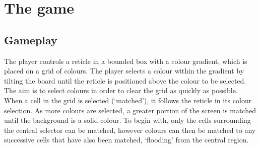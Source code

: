 \section{The game}
\subsection{Gameplay}
The player controls a reticle in a bounded box with a colour gradient, which is placed on a grid of colours.
The player selects a colour within the gradient 
by tilting the board until the reticle is positioned above the colour to be selected.
The aim is to select colours in 
order to clear the grid as quickly as possible. When a cell in the grid is selected (`matched'), it 
follows the reticle in its colour selection. As more colours are selected, a greater portion of the screen is matched 
until the background is a solid colour. To begin with, only the cells surrounding the central selector can be matched,
however colours can then be matched to any successive cells that have also been matched, `flooding' from the central region. 
